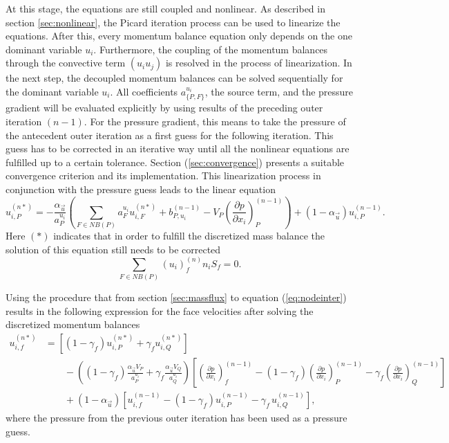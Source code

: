 At this stage, the equations are still coupled and nonlinear. As described in section \ref{sec:nonlinear}, the Picard iteration process can be used to linearize the equations. After this, every momentum balance equation only depends on the one dominant variable \(u_i\). Furthermore, the coupling of the momentum balances through the convective term \((u_i u_j)\) is resolved in the process of linearization. In the next step, the decoupled momentum balances can be solved sequentially for the dominant variable \(u_i\). All coefficients \(a_{\{P,F\}}^{u_i}\), the source term, and the pressure gradient will be evaluated explicitly by using results of the preceding outer iteration \((n-1)\). For the pressure gradient, this means to take the pressure of the antecedent outer iteration as a first guess for the following iteration. This guess has to be corrected in an iterative way until all the nonlinear equations are fulfilled up to a certain tolerance. Section (\ref{sec:convergence}) presents a suitable convergence criterion and its implementation. This linearization process in conjunction with the pressure guess leads to the linear equation 
\begin{equation}
  \label{eq:nodeinter}
  u_{i,P}^{(n*)} 
  = 
  - \frac{\alpha_{\vec{u}}}{a_P^{u_i}} \left(\sum_{F \in NB(P)} a_F^{u_i} u_{i,F}^{(n*)}
  +                                     b_{P,u_i}^{(n-1)} 
  -                                     V_P\left(\frac{\partial p}{\partial x_i}\right)_P^{(n-1)} \right)
  + \left(1 - \alpha_{\vec{u}}\right) u_{i,P}^{(n-1)}.
\end{equation}
Here \((*)\) indicates that in order to fulfill the discretized mass balance the solution of this equation still needs to be corrected 
\begin{equation}
  \label{eq:contisemi}
  \sum_{F \in NB(P)} (u_i)_f^{(n)} n_i S_f = 0.
\end{equation}

Using the procedure that from section \ref{sec:massflux} to equation (\ref{eq:nodeinter}) results in the following expression for the face velocities after solving the discretized momentum balances 
\begin{align}
  \label{eq:faceinter}
  u_{i,f}^{(n*)} 
  &=
  \left[\left(1 - \gamma_f\right) u_{i,P}^{(n*)} + \gamma_f u_{i,Q}^{(n*)} \right] \nonumber \\[1em]
  &\quad\quad - 
  \left(\left(1 - \gamma_f\right) \frac{\alpha_\vec{u} V_P}{a_P^{u_i}} + \gamma_f \frac{\alpha_\vec{u} V_Q}{a_Q^{u_i}}\right)
  \left[ 
  \left(\frac{\partial p}{\partial x_i}\right)_f^{(n-1)} 
  - \left( 1 - \gamma_f \right) \left( \frac{\partial p}{\partial x_i} \right)_P^{(n-1)} 
  - \gamma_f \left(\frac{\partial p}{\partial x_i}\right)_Q^{(n-1)}
  \right] \nonumber \\[1em]
  &\quad\quad + \left(1 - \alpha_\vec{u}\right) \left[ u_{i,f}^{(n-1)} - \left(1 - \gamma_f\right) u_{i,P}^{(n-1)} - \gamma_f \, u_{i,Q}^{(n-1)} \right],
\end{align}
where the pressure from the previous outer iteration has been used as a pressure guess.


